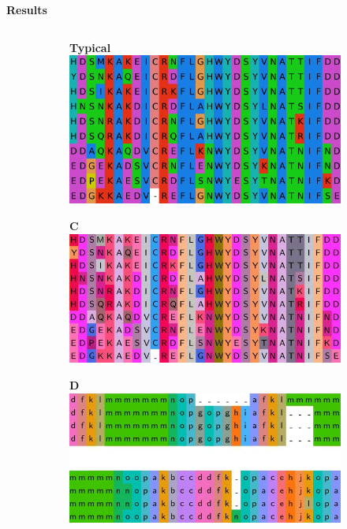 \documentclass[bigger]{beamer}
\newcommand{\tb}[1]{\textbf{#1}}
\begin{document}
\begin{frame}{\tb{Results}}
\begin{columns}[T, onlytextwidth]
\begin{column}{0.55\textwidth}
\begin{figure}
                \medskip

                \begin{subfigure}[t]{.4\linewidth}
                    \tb{Typical}
                    \includegraphics[scale=0.1, valign=t, frame]{images/typical.png}
                \end{subfigure}

                \medskip
                
                \begin{subfigure}[t]{.4\linewidth}
                    \tb{C}
                    \includegraphics[scale=0.2, valign=t, frame]{images/C.png}
                \end{subfigure}\hfill
                \begin{subfigure}[t]{.4\linewidth}
                    \tb{D}
                    \includegraphics[scale=0.2, valign=t, frame]{images/D.png}
                \end{subfigure}
            \end{figure}
        \end{column}
    \end{columns}
\end{frame}
\end{document}

